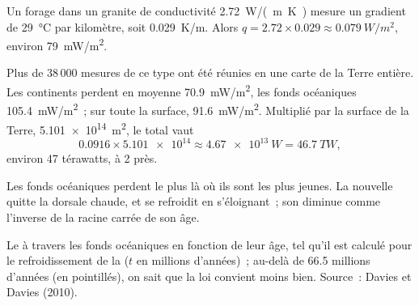 \begin{example}\label{ex:g12:internal-heat:borehole}
Un forage dans un granite de conductivité \qty{2.72}{W/(m.K)} mesure un
gradient de \qty{29}{\celsius} par kilomètre, soit \qty{0.029}{K/m}.
Alors $q = 2.72 \times 0.029 \approx \qty{0.079}{W/m^2}$, environ
\qty{79}{mW/m^2}.
\end{example}

Plus de 38\,000 mesures de ce type ont été réunies en une carte de la
Terre entière. Les continents perdent en moyenne \qty{70.9}{mW/m^2}, les
fonds océaniques \qty{105.4}{mW/m^2}~; sur toute la surface,
\qty{91.6}{mW/m^2}. Multiplié par la surface de la Terre,
\qty{5.101e14}{m^2}, le total vaut
\[
  0.0916 \times \num{5.101e14} \approx \qty{4.67e13}{W} = \qty{46.7}{TW},
\]
environ 47 térawatts, à 2 près.

Les fonds océaniques perdent le plus là où ils sont les plus jeunes. La
 nouvelle quitte la dorsale chaude, et se refroidit en
s'éloignant~; son  diminue comme l'inverse de la racine
carrée de son âge.

\begin{omfigure}

{\small Le  à travers les fonds océaniques en fonction de
leur âge, tel qu'il est calculé pour le refroidissement de la 
($t$ en millions d'années)~; au-delà de 66.5 millions d'années (en
pointillés), on sait que la loi convient moins bien. Source~: Davies et
Davies (2010).}
\end{omfigure}

